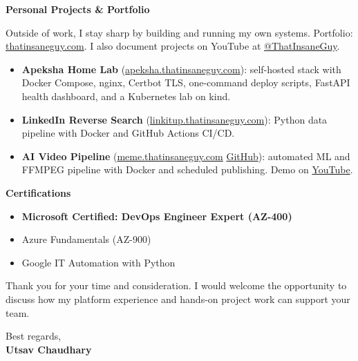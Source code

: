 \documentclass[10pt, letterpaper]{article}
\begin{document}
\textbf{Personal Projects \& Portfolio}

Outside of work, I stay sharp by building and running my own systems. Portfolio: \href{https://thatinsaneguy28.netlify.app/}{thatinsaneguy.com}. I also document projects on YouTube at \href{https://www.youtube.com/@ThatInsaneGuy}{@ThatInsaneGuy}.

\begin{itemize}
    \item \textbf{Apeksha Home Lab} (\href{https://apeksha.thatinsaneguy.com/}{apeksha.thatinsaneguy.com}): self-hosted stack with Docker Compose, nginx, Certbot TLS, one-command deploy scripts, FastAPI health dashboard, and a Kubernetes lab on kind.
    \item \textbf{LinkedIn Reverse Search} (\href{https://linkitup.thatinsaneguy.com/}{linkitup.thatinsaneguy.com}): Python data pipeline with Docker and GitHub Actions CI/CD.
    \item \textbf{AI Video Pipeline} (\href{https://meme.thatinsaneguy.com/}{meme.thatinsaneguy.com} \textbar{} \href{https://github.com/UttU28/MemeMaker/}{GitHub}): automated ML and FFMPEG pipeline with Docker and scheduled publishing. Demo on \href{https://www.youtube.com/@ThatInsaneGuy}{YouTube}.
\end{itemize}

\textbf{Certifications}
\begin{itemize}
    \item \textbf{Microsoft Certified: DevOps Engineer Expert (AZ-400)}
    \item Azure Fundamentals (AZ-900)
    \item Google IT Automation with Python
\end{itemize}

Thank you for your time and consideration. I would welcome the opportunity to discuss how my platform experience and hands-on project work can support your team.

\vspace{0.4cm}

Best regards,\\
\textbf{Utsav Chaudhary}
\end{document}
